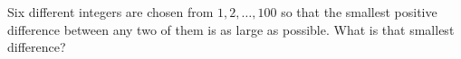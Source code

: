 Six different integers are chosen from $1,2,\dots,100$ so that the smallest positive difference between any two of them is as large as possible. What is that smallest difference?
